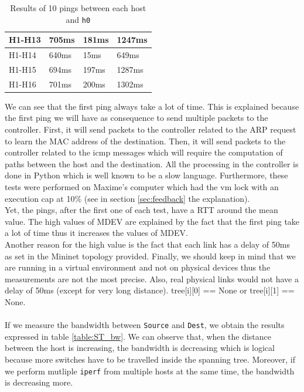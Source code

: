 \documentclass[a4paper, 11pt, oneside]{article}
\begin{document}
\begin{table}[H]
\begin{tabular}{|l|l|l|l|}
H1-H13                                     & 705ms                              & 181ms                              & 1247ms                                 \\ \hline
H1-H14                                     & 640ms                              & 15ms                              & 649ms                                 \\ \hline
H1-H15                                     & 694ms                              & 197ms                              & 1287ms                                 \\ \hline
H1-H16                                     & 701ms                              & 200ms                              & 1302ms                                 \\ \hline
\end{tabular}
\caption{Results of 10 pings between each host and \texttt{h0}}
\label{table:STCPings}
\end{table}
We can see that the first ping always take a lot of time. This is explained because the first ping we will have as consequence to send multiple packets to the controller. First, it will send packets to the controller related to the ARP request to learn the MAC address of the destination. Then, it will send packets to the controller related to the icmp messages which will require the computation of paths between the host and the destination. All the processing in the controller is done in Python which is well known to be a slow language. Furthermore, these tests were performed on Maxime's computer which had the vm lock with an execution cap at 10\% (see in section \ref{sec:feedback} the explanation).\\
Yet, the pings, after the first one of each test, have a RTT around the mean value. The high values of MDEV are explained by the fact that the first ping take a lot of time thus it increases the values of MDEV.\\
Another reason for the high value is the fact that each link has a delay of 50ms as set in the Mininet topology provided. Finally, we should keep in mind that we are running in a virtual environment and not on physical devices thus the measurements are not the most precise. Also, real physical links would not have a delay of 50ms (except for very long distance).
tree[i][0] == None or tree[i][1] == None.

\paragraph{}If we measure the bandwidth between \texttt{Source} and \texttt{Dest}, we obtain the results expressed in table \ref{table:ST_bw}. We can observe that, when the distance between the host is increasing, the bandwidth is decreasing which is logical because more switches have to be travelled inside the spanning tree. Moreover, if we perform mutliple \texttt{iperf} from multiple hosts at the same time, the bandwidth is decreasing more.
\end{document}
